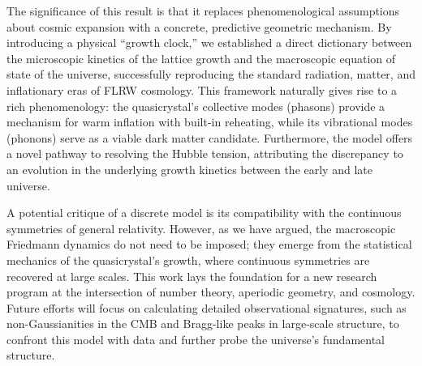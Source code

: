\documentclass[universe,article,submit,pdftex,moreauthors]{Definitions/mdpi}
\begin{document}
The significance of this result is that it replaces phenomenological assumptions about cosmic expansion with a concrete, predictive geometric mechanism. By introducing a physical ``growth clock,'' we established a direct dictionary between the microscopic kinetics of the lattice growth and the macroscopic equation of state of the universe, successfully reproducing the standard radiation, matter, and inflationary eras of FLRW cosmology. This framework naturally gives rise to a rich phenomenology: the quasicrystal's collective modes (phasons) provide a mechanism for warm inflation with built-in reheating, while its vibrational modes (phonons) serve as a viable dark matter candidate. Furthermore, the model offers a novel pathway to resolving the Hubble tension, attributing the discrepancy to an evolution in the underlying growth kinetics between the early and late universe.

A potential critique of a discrete model is its compatibility with the continuous symmetries of general relativity. However, as we have argued, the macroscopic Friedmann dynamics do not need to be imposed; they emerge from the statistical mechanics of the quasicrystal's growth, where continuous symmetries are recovered at large scales. This work lays the foundation for a new research program at the intersection of number theory, aperiodic geometry, and cosmology. Future efforts will focus on calculating detailed observational signatures, such as non-Gaussianities in the CMB and Bragg-like peaks in large-scale structure, to confront this model with data and further probe the universe's fundamental structure.







\end{document}
